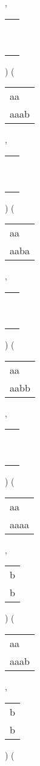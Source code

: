 \begin{description}
\begin{tabular}{|l|}
\hline
\end{tabular} 
 , 
\begin{tabular}{|l|} \hline
\ \\ \ \\ \hline
\end{tabular} 
) 
 ( 
\begin{tabular}{|l|} \hline
aa\ \  \\
aaab \\
\hline
\end{tabular} 
 , 
\begin{tabular}{|l|} \hline
\ \\ \ \\ \hline
\end{tabular} 
) 
 ( 
\begin{tabular}{|l|} \hline
aa\ \  \\
aaba \\
\hline
\end{tabular} 
 , 
\begin{tabular}{|l|} \hline
\ \\ \ \\ \hline
\end{tabular} 
) 
 ( 
\begin{tabular}{|l|} \hline
aa\ \  \\
aabb \\
\hline
\end{tabular} 
 , 
\begin{tabular}{|l|} \hline
\ \\ \ \\ \hline
\end{tabular} 
) 
 ( 
\begin{tabular}{|l|} \hline
aa\ \  \\
aaaa \\
\hline
\end{tabular} 
 , 
\begin{tabular}{|l|} \hline
b \\
b \\
\hline
\end{tabular} 
) 
 ( 
\begin{tabular}{|l|} \hline
aa\ \  \\
aaab \\
\hline
\end{tabular} 
 , 
\begin{tabular}{|l|} \hline
b \\
b \\
\hline
\end{tabular} 
) 
 ( 
\begin{tabular}{|l|} \hline

\end{tabular}
\end{description}
